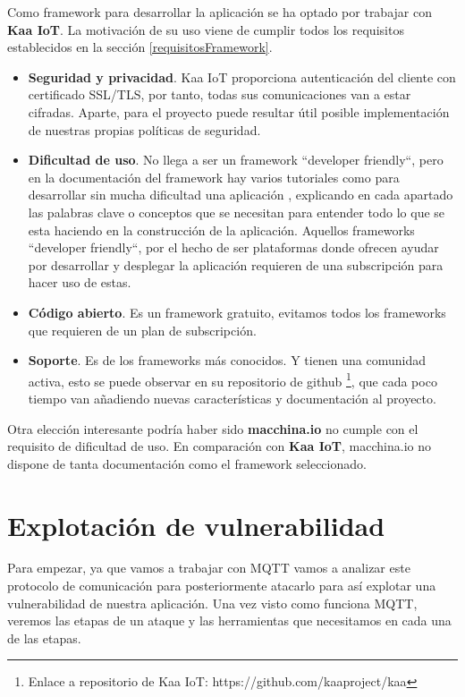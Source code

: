 Como framework para desarrollar la aplicación se ha optado por trabajar con \textbf{Kaa IoT}. La motivación de su uso viene de cumplir todos los requisitos establecidos en la sección \ref{requisitosFramework}.

\begin{itemize}
    \item \textbf{Seguridad y privacidad}. Kaa IoT proporciona autenticación del cliente con certificado SSL/TLS, por tanto, todas sus comunicaciones van a estar cifradas. Aparte, para el proyecto puede resultar útil posible implementación de nuestras propias políticas de seguridad.
    \item \textbf{Dificultad de uso}. No llega a ser un framework ``developer friendly``, pero en la documentación del framework \cite{kaaiot} hay varios tutoriales como para desarrollar sin mucha dificultad una aplicación , explicando en cada apartado las palabras clave o conceptos que se necesitan para entender todo lo que se esta haciendo en la construcción de la aplicación. Aquellos frameworks ``developer friendly``, por el hecho de ser plataformas donde ofrecen ayudar por desarrollar y desplegar la aplicación requieren de una subscripción para hacer uso de estas.
    \item \textbf{Código abierto}. Es un framework gratuito, evitamos todos los frameworks que requieren de un plan de subscripción.
    \item \textbf{Soporte}. Es de los frameworks más conocidos. Y tienen una comunidad activa, esto se puede observar en su repositorio de github \footnote{Enlace a repositorio de Kaa IoT: https://github.com/kaaproject/kaa}, que cada poco tiempo van añadiendo nuevas características y documentación al proyecto.
\end{itemize}


Otra elección interesante podría haber sido \textbf{macchina.io} no cumple con el requisito de dificultad de uso. En comparación con \textbf{Kaa IoT}, macchina.io no dispone de tanta documentación como el framework seleccionado.


\section{Explotación de vulnerabilidad} \label{exploit-analysis}

Para empezar, ya que vamos a trabajar con MQTT vamos a analizar este protocolo de comunicación para posteriormente atacarlo para así explotar una vulnerabilidad de nuestra aplicación. Una vez visto como funciona MQTT, veremos las etapas de un ataque y las herramientas que necesitamos en cada una de las etapas.

